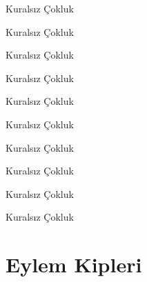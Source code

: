 \begin{kip}{}{Kuralsız Çokluk}
\end{kip}

\begin{kip}{}{Kuralsız Çokluk}
\end{kip}

\begin{kip}{}{Kuralsız Çokluk}
\end{kip}

\begin{kip}{}{Kuralsız Çokluk}
\end{kip}

\begin{kip}{}{Kuralsız Çokluk}
\end{kip}

\begin{kip}{}{Kuralsız Çokluk}
\end{kip}

\begin{kip}{}{Kuralsız Çokluk}
\end{kip}

\begin{kip}{}{Kuralsız Çokluk}
\end{kip}

\begin{kip}{}{Kuralsız Çokluk}
\end{kip}

\begin{kip}{}{Kuralsız Çokluk}
\end{kip}












\section{Eylem Kipleri}




